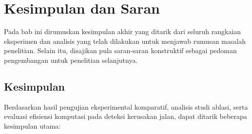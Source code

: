 \chapter{Kesimpulan dan Saran}
\label{chap:kesimpulan_saran}

Pada bab ini dirumuskan kesimpulan akhir yang ditarik dari seluruh rangkaian eksperimen dan analisis yang telah dilakukan untuk menjawab rumusan masalah penelitian. Selain itu, disajikan pula saran-saran konstruktif sebagai pedoman pengembangan untuk penelitian selanjutnya.

\section{Kesimpulan}
\label{sec:kesimpulan}

Berdasarkan hasil pengujian eksperimental komparatif, analisis studi ablasi, serta evaluasi efisiensi komputasi pada deteksi kerusakan jalan, dapat ditarik beberapa kesimpulan utama:
